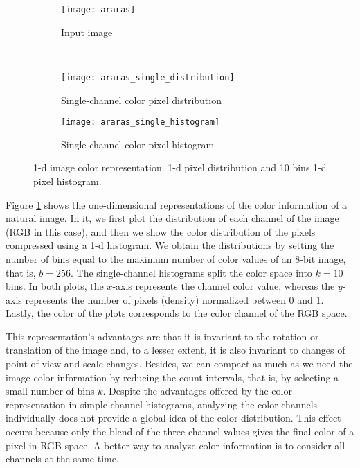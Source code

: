 \begin{figure}[!ht]

	\centering
    \begin{subfigure}[b]{0.25\textwidth}
        \texttt{[image: araras]}
        \caption{Input image}
    \end{subfigure} \\
       
    \begin{subfigure}[b]{0.49\textwidth}
        \texttt{[image: araras\_single\_distribution]}
        \caption{Single-channel color pixel distribution}
    \end{subfigure} 
    \begin{subfigure}[b]{0.49\textwidth}
        \texttt{[image: araras\_single\_histogram]}
        \caption{Single-channel color pixel histogram}
    \end{subfigure}    
    
    \caption{1-d image color representation. 1-d pixel distribution and 10 bins 1-d pixel histogram.}\label{fig:single_channel_histogram}    
\end{figure}

Figure \ref{fig:single_channel_histogram} shows the one-dimensional representations of the color information of a natural image. In it, we first plot the distribution of each channel of the image (RGB in this case), and then we show the color distribution of the pixels compressed using a 1-d histogram. We obtain the distributions by setting the number of bins equal to the maximum number of color values of an 8-bit image, that is, $b = 256$. The single-channel histograms split the color space into $k=10$ bins. In both plots, the $x$-axis represents the channel color value, whereas the $y$-axis represents the number of pixels (density) normalized between 0 and 1. Lastly, the color of the plots corresponds to the color channel of the RGB space.

This representation's advantages are that it is invariant to the rotation or translation of the image and, to a lesser extent, it is also invariant to changes of point of view and scale changes. Besides, we can compact as much as we need the image color information by reducing the count intervals, that is, by selecting a small number of bins $k$. Despite the advantages offered by the color representation in simple channel histograms, analyzing the color channels individually does not provide a global idea of the color distribution. This effect occurs because only the blend of the three-channel values gives the final color of a pixel in RGB space. A better way to analyze color information is to consider all channels at the same time.

